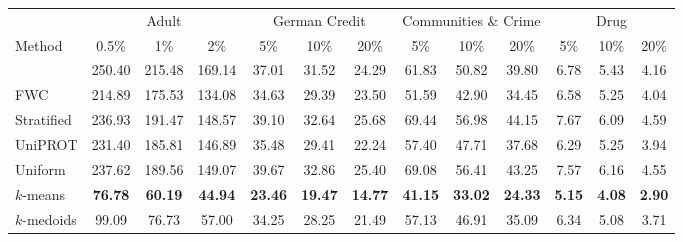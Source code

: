 \begin{tabular}{lcccccccccccc}
\toprule
 & \multicolumn{3}{c}{Adult} & \multicolumn{3}{c}{German Credit} & \multicolumn{3}{c}{Communities \& Crime} & \multicolumn{3}{c}{Drug}\\
\cmidrule(lr){2-4} \cmidrule(lr){5-7} \cmidrule(lr){8-10} \cmidrule(lr){11-13}
Method & 0.5\% & 1\% & 2\% & 5\% & 10\% & 20\% & 5\% & 10\% & 20\% & 5\% & 10\% & 20\%\\
\midrule
\method{} & 250.40 & 215.48 & 169.14 & 37.01 & 31.52 & 24.29 & 61.83 & 50.82 & 39.80 & 6.78 & 5.43 & 4.16\\
FWC & 214.89 & 175.53 & 134.08 & 34.63 & 29.39 & 23.50 & 51.59 & 42.90 & 34.45 & 6.58 & 5.25 & 4.04\\
Stratified & 236.93 & 191.47 & 148.57 & 39.10 & 32.64 & 25.68 & 69.44 & 56.98 & 44.15 & 7.67 & 6.09 & 4.59\\
UniPROT & 231.40 & 185.81 & 146.89 & 35.48 & 29.41 & 22.24 & 57.40 & 47.71 & 37.68 & 6.29 & 5.25 & 3.94\\
Uniform & 237.62 & 189.56 & 149.07 & 39.67 & 32.86 & 25.40 & 69.08 & 56.41 & 43.25 & 7.57 & 6.16 & 4.55\\
$k$-means & \textbf{76.78} & \textbf{60.19} & \textbf{44.94} & \textbf{23.46} & \textbf{19.47} & \textbf{14.77} & \textbf{41.15} & \textbf{33.02} & \textbf{24.33} & \textbf{5.15} & \textbf{4.08} & \textbf{2.90}\\
$k$-medoids & 99.09 & 76.73 & 57.00 & 34.25 & 28.25 & 21.49 & 57.13 & 46.91 & 35.09 & 6.34 & 5.08 & 3.71\\
\bottomrule
\end{tabular}
